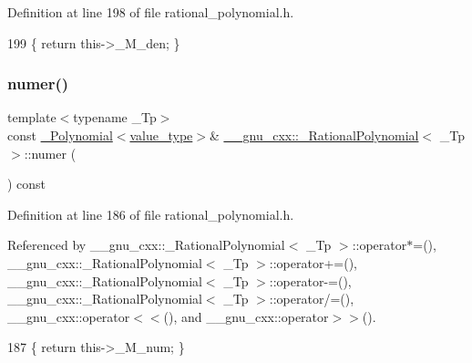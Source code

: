 Definition at line 198 of file rational\+\_\+polynomial.\+h.


\begin{DoxyCode}
199       \{ \textcolor{keywordflow}{return} this->\_M\_den; \}
\end{DoxyCode}
\mbox{\label{class____gnu__cxx_1_1__RationalPolynomial_aa42ac2f6c2368cae05ba3a3cebf0fa24}} 
\subsubsection{\texorpdfstring{numer()}{numer()}\hspace{0.1cm}{\footnotesize\ttfamily [1/2]}}
{\footnotesize\ttfamily template$<$typename \+\_\+\+Tp$>$ \\
const \hyperlink{class____gnu__cxx_1_1__Polynomial}{\+\_\+\+Polynomial}$<$\hyperlink{class____gnu__cxx_1_1__RationalPolynomial_adeec7f1bec03111031599f337848ee8b}{value\+\_\+type}$>$\& \hyperlink{class____gnu__cxx_1_1__RationalPolynomial}{\+\_\+\+\_\+gnu\+\_\+cxx\+::\+\_\+\+Rational\+Polynomial}$<$ \+\_\+\+Tp $>$\+::numer (\begin{DoxyParamCaption}{ }\end{DoxyParamCaption}) const\hspace{0.3cm}{\ttfamily [inline]}}



Definition at line 186 of file rational\+\_\+polynomial.\+h.



Referenced by \+\_\+\+\_\+gnu\+\_\+cxx\+::\+\_\+\+Rational\+Polynomial$<$ \+\_\+\+Tp $>$\+::operator$\ast$=(), \+\_\+\+\_\+gnu\+\_\+cxx\+::\+\_\+\+Rational\+Polynomial$<$ \+\_\+\+Tp $>$\+::operator+=(), \+\_\+\+\_\+gnu\+\_\+cxx\+::\+\_\+\+Rational\+Polynomial$<$ \+\_\+\+Tp $>$\+::operator-\/=(), \+\_\+\+\_\+gnu\+\_\+cxx\+::\+\_\+\+Rational\+Polynomial$<$ \+\_\+\+Tp $>$\+::operator/=(), \+\_\+\+\_\+gnu\+\_\+cxx\+::operator$<$$<$(), and \+\_\+\+\_\+gnu\+\_\+cxx\+::operator$>$$>$().


\begin{DoxyCode}
187       \{ \textcolor{keywordflow}{return} this->\_M\_num; \}
\end{DoxyCode}
\mbox{\label{class____gnu__cxx_1_1__RationalPolynomial_ab672b7b5adc77e5937611ea20c9e68b0}} 

